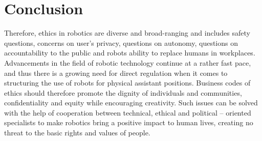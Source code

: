 \section{Conclusion}
Therefore, ethics in robotics are diverse and broad-ranging and includes safety questions, concerns on user’s privacy, questions on autonomy, questions on accountability to the public and robots ability to replace humans in workplaces. Advancements in the field of robotic technology continue at a rather fast pace, and thus there is a growing need for direct regulation when it comes to structuring the use of robots for physical assistant positions. Business codes of ethics should therefore promote the dignity of individuals and communities, confidentiality and equity while encouraging creativity. Such issues can be solved with the help of cooperation between technical, ethical and political – oriented specialists to make robotics bring a positive impact to human lives, creating no threat to the basic rights and values of people.

\clearpage